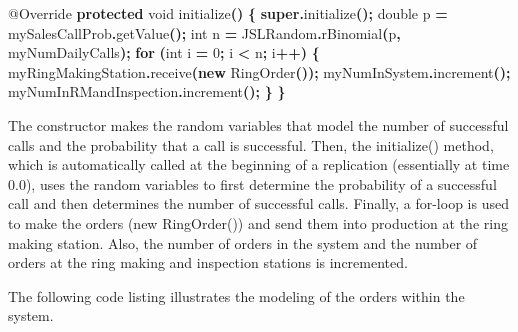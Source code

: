\documentclass[
]{book}
\newenvironment{Shaded}{\begin{snugshade}}{\end{snugshade}}
\newcommand{\AttributeTok}[1]{\textcolor[rgb]{0.77,0.63,0.00}{#1}}
\newcommand{\ControlFlowTok}[1]{\textcolor[rgb]{0.13,0.29,0.53}{\textbf{#1}}}
\newcommand{\DataTypeTok}[1]{\textcolor[rgb]{0.13,0.29,0.53}{#1}}
\newcommand{\DecValTok}[1]{\textcolor[rgb]{0.00,0.00,0.81}{#1}}
\newcommand{\FunctionTok}[1]{\textcolor[rgb]{0.00,0.00,0.00}{#1}}
\newcommand{\KeywordTok}[1]{\textcolor[rgb]{0.13,0.29,0.53}{\textbf{#1}}}
\newcommand{\NormalTok}[1]{#1}
\newcommand{\OperatorTok}[1]{\textcolor[rgb]{0.81,0.36,0.00}{\textbf{#1}}}
\theoremstyle{definition}
\theoremstyle{definition}
\theoremstyle{definition}
\theoremstyle{definition}
\theoremstyle{remark}
\begin{document}
\begin{Shaded}
\begin{Highlighting}[]
\AttributeTok{@Override}
\KeywordTok{protected} \DataTypeTok{void} \FunctionTok{initialize}\OperatorTok{()} \OperatorTok{\{}
    \KeywordTok{super}\OperatorTok{.}\FunctionTok{initialize}\OperatorTok{();}
    \DataTypeTok{double}\NormalTok{ p }\OperatorTok{=}\NormalTok{ mySalesCallProb}\OperatorTok{.}\FunctionTok{getValue}\OperatorTok{();}
    \DataTypeTok{int}\NormalTok{ n }\OperatorTok{=}\NormalTok{ JSLRandom}\OperatorTok{.}\FunctionTok{rBinomial}\OperatorTok{(}\NormalTok{p}\OperatorTok{,}\NormalTok{ myNumDailyCalls}\OperatorTok{);}
    \ControlFlowTok{for} \OperatorTok{(}\DataTypeTok{int}\NormalTok{ i }\OperatorTok{=} \DecValTok{0}\OperatorTok{;}\NormalTok{ i }\OperatorTok{\textless{}}\NormalTok{ n}\OperatorTok{;}\NormalTok{ i}\OperatorTok{++)} \OperatorTok{\{}
\NormalTok{        myRingMakingStation}\OperatorTok{.}\FunctionTok{receive}\OperatorTok{(}\KeywordTok{new} \FunctionTok{RingOrder}\OperatorTok{());}
\NormalTok{        myNumInSystem}\OperatorTok{.}\FunctionTok{increment}\OperatorTok{();}
\NormalTok{        myNumInRMandInspection}\OperatorTok{.}\FunctionTok{increment}\OperatorTok{();}
    \OperatorTok{\}}
\OperatorTok{\}}
\end{Highlighting}
\end{Shaded}

The constructor makes the random variables that
model the number of successful calls and the probability that a call is
successful. Then, the initialize() method, which is automatically called
at the beginning of a replication (essentially at time 0.0), uses the
random variables to first determine the probability of a successful call
and then determines the number of successful calls.
Finally, a for-loop is used to make the orders (new RingOrder()) and
send them into production at the ring making station. Also,
the number of orders in the system and the number of orders at the ring
making and inspection stations is incremented.

The following code listing illustrates the modeling of the orders within
the system.
\end{document}
